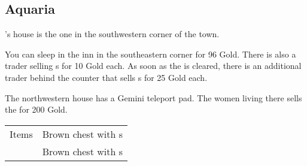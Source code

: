 \subsection{Aquaria}
\label{map:aquaria}

's house is the one in the southwestern corner of the town. 

You can sleep in the inn in the southeastern corner for 96 Gold. There is also a trader selling s for 10 Gold each.  As soon as the  is cleared, there is an additional trader behind the counter that sells s for 25 Gold each.

The northwestern house has a Gemini teleport pad. The women living there sells the  for 200 Gold.

\noindent\begin{tabularx}{\textwidth}[l]{lX}
	Items & Brown chest with \nameref{item:heal_potion}s \\
	& Brown chest with \nameref{item:refresher}s
\end{tabularx}

